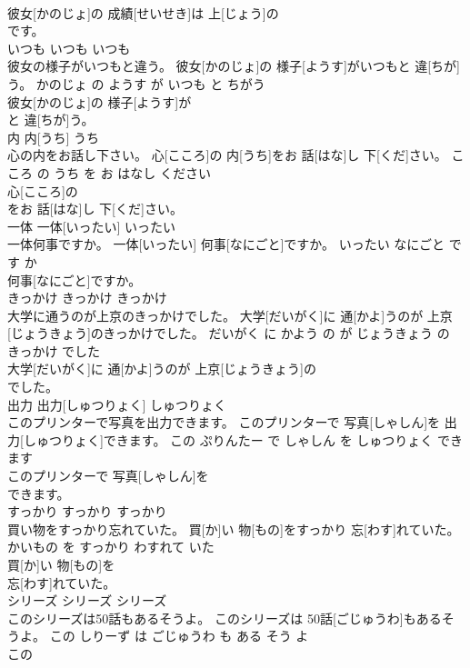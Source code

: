 \documentclass[8pt]{extreport}
\begin{document}
\begin{CJK}{UTF8}{min}
\\	彼女[かのじょ]の 成績[せいせき]は 上[じょう]の
\\	です。			
\\	いつも	いつも	いつも	
\\	彼女の様子がいつもと違う。	彼女[かのじょ]の 様子[ようす]がいつもと 違[ちが]う。	かのじょ の ようす が いつも と ちがう	
\\	彼女[かのじょ]の 様子[ようす]が
\\	と 違[ちが]う。			
\\	内	内[うち]	うち	
\\	心の内をお話し下さい。	心[こころ]の 内[うち]をお 話[はな]し 下[くだ]さい。	こころ の うち を お はなし ください	
\\	心[こころ]の
\\	をお 話[はな]し 下[くだ]さい。			
\\	一体	一体[いったい]	いったい	
\\	一体何事ですか。	一体[いったい] 何事[なにごと]ですか。	いったい なにごと です か	
\\	何事[なにごと]ですか。			
\\	きっかけ	きっかけ	きっかけ	
\\	大学に通うのが上京のきっかけでした。	大学[だいがく]に 通[かよ]うのが 上京[じょうきょう]のきっかけでした。	だいがく に かよう の が じょうきょう の きっかけ でした	
\\	大学[だいがく]に 通[かよ]うのが 上京[じょうきょう]の
\\	でした。			
\\	出力	出力[しゅつりょく]	しゅつりょく	
\\	このプリンターで写真を出力できます。	このプリンターで 写真[しゃしん]を 出力[しゅつりょく]できます。	この ぷりんたー で しゃしん を しゅつりょく できます	
\\	このプリンターで 写真[しゃしん]を
\\	できます。			
\\	すっかり	すっかり	すっかり	
\\	買い物をすっかり忘れていた。	買[か]い 物[もの]をすっかり 忘[わす]れていた。	かいもの を すっかり わすれて いた	
\\	買[か]い 物[もの]を
\\	忘[わす]れていた。			
\\	シリーズ	シリーズ	シリーズ	
\\	このシリーズは50話もあるそうよ。	このシリーズは 50話[ごじゅうわ]もあるそうよ。	この しりーず は ごじゅうわ も ある そう よ	
\\	この

\end{CJK}
\end{document}
